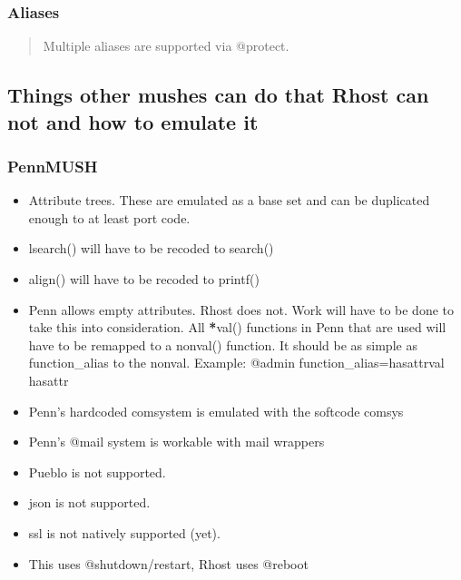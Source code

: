 \documentclass[letterpaper,10pt,english]{sphinxmanual}
\begin{document}
\subsubsection{Aliases}
\label{\detokenize{differences:aliases}}\begin{quote}

\sphinxAtStartPar
Multiple aliases are supported via @protect.
\end{quote}


\subsection{Things other mushes can do that Rhost can not and how to emulate it}
\label{\detokenize{differences:things-other-mushes-can-do-that-rhost-can-not-and-how-to-emulate-it}}

\subsubsection{PennMUSH}
\label{\detokenize{differences:id4}}\begin{itemize}
\item {} 
\sphinxAtStartPar
Attribute trees.  These are emulated as a base set and can be duplicated enough to at least port code.

\item {} 
\sphinxAtStartPar
lsearch() will have to be recoded to search()

\item {} 
\sphinxAtStartPar
align() will have to be recoded to printf()

\item {} 
\sphinxAtStartPar
Penn allows empty attributes.  Rhost does not.  Work will have to be done to take this into consideration.  \sphinxhyphen{} All {\color{red}\bfseries{}*}val() functions in Penn that are used will have to be remapped to a non\sphinxhyphen{}{\color{red}\bfseries{}*}val() function.  It should be as simple as function\_alias to the non\sphinxhyphen{}{\color{red}\bfseries{}*}val.  Example: @admin function\_alias=hasattrval hasattr

\item {} 
\sphinxAtStartPar
Penn’s hardcoded comsystem is emulated with the softcode comsys

\item {} 
\sphinxAtStartPar
Penn’s @mail system is workable with mail wrappers

\item {} 
\sphinxAtStartPar
Pueblo is not supported.

\item {} 
\sphinxAtStartPar
json is not supported.

\item {} 
\sphinxAtStartPar
ssl is not natively supported (yet).

\item {} 
\sphinxAtStartPar
This uses @shutdown/restart, Rhost uses @reboot

\end{itemize}
\end{document}
